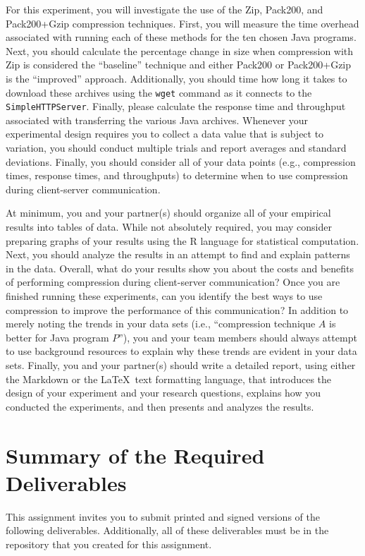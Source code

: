 For this experiment, you will investigate the use of the Zip, Pack200, and Pack200+Gzip compression techniques. First,
you will measure the time overhead associated with running each of these methods for the ten chosen Java programs. Next,
you should calculate the percentage change in size when compression with Zip is considered the ``baseline'' technique
and either Pack200 or Pack200+Gzip is the ``improved'' approach. Additionally, you should time how long it takes to
download these archives using the {\tt wget} command as it connects to the {\tt SimpleHTTPServer}. Finally, please
calculate the response time and throughput associated with transferring the various Java archives. Whenever your
experimental design requires you to collect a data value that is subject to variation, you should conduct multiple
trials and report averages and standard deviations. Finally, you should consider all of your data points (e.g.,
compression times, response times, and throughputs) to determine when to use compression during client-server
communication.

At minimum, you and your partner(s) should organize all of your empirical results into tables of data. While not
absolutely required, you may consider preparing graphs of your results using the R language for statistical computation.
Next, you should analyze the results in an attempt to find and explain patterns in the data. Overall, what do your
results show you about the costs and benefits of performing compression during client-server communication? Once you are
finished running these experiments, can you identify the best ways to use compression to improve the performance of this
communication?  In addition to merely noting the trends in your data sets (i.e., ``compression technique $A$ is better
for Java program $P$''), you and your team members should always attempt to use background resources to explain why
these trends are evident in your data sets.  Finally, you and your partner(s) should write a detailed report, using
either the Markdown or the \LaTeX~text formatting language, that introduces the design of your experiment and your
research questions, explains how you conducted the experiments, and then presents and analyzes the results.

\section*{Summary of the Required Deliverables}

This assignment invites you to submit printed and signed versions of the following deliverables. Additionally,
all of these deliverables must be in the repository that you created for this assignment.

